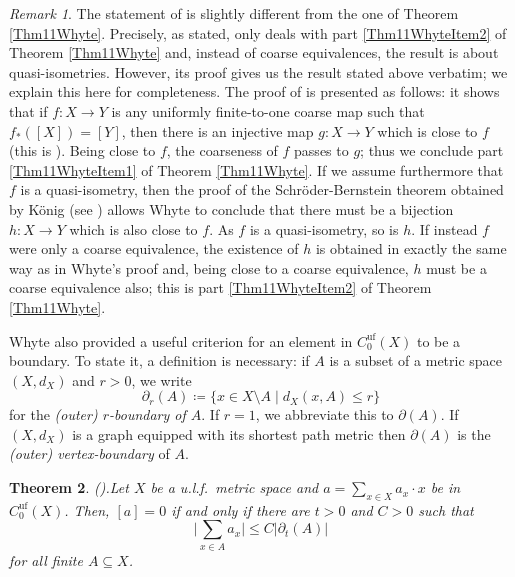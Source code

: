\documentclass[11pt]{amsart}
\numberwithin{equation}{section}
\newtheorem{theorem}{Theorem}[section]
\theoremstyle{definition}
\theoremstyle{remark}
\newtheorem{remark}[theorem]{Remark}
\newcommand{\ri}{\partial}
\numberwithin{equation}{section}
\begin{document}
 

\begin{remark}
The statement of \cite[Theorem 1.1]{Whyte1999Duke} is slightly different from the one of Theorem \ref{Thm11Whyte}. Precisely, as stated, \cite[Theorem 1.1]{Whyte1999Duke} only deals with part \eqref{Thm11WhyteItem2} of Theorem \ref{Thm11Whyte} and, instead of coarse equivalences, the result is about quasi-isometries. However, its proof gives us the result stated above verbatim; we explain this here for completeness. The proof of \cite[Theorem 1.1]{Whyte1999Duke} is presented as follows: it shows that if $f\colon X\to Y$ is any uniformly finite-to-one coarse map such that $f_*([X])=[Y]$, then there is an injective map $g\colon X\to Y$ which is close to $f$ (this is \cite[Lemma 4.2]{Whyte1999Duke}). Being close to $f$, the coarseness of $f$ passes to $g$; thus we conclude part \eqref{Thm11WhyteItem1} of Theorem \ref{Thm11Whyte}. If we assume furthermore that $f$ is a quasi-isometry, then the proof of the Schr\"oder-Bernstein theorem obtained by K\"{o}nig (see \cite[Page 88]{HalmosBook}) allows Whyte to conclude that there must be a bijection $h\colon X\to Y$ which is also close to $f$. As $f$ is a quasi-isometry, so is $h$. If instead $f$ were only a coarse equivalence, the existence of $h$ is obtained in exactly the same way as in Whyte's proof and, being close to a coarse equivalence, $h$ must be a coarse equivalence also; this is part \eqref{Thm11WhyteItem2} of Theorem \ref{Thm11Whyte}.
\end{remark}

Whyte also provided a useful criterion for an element in $C^{\textrm{uf}}_0(X)$ to be a boundary. To state it, a definition is necessary: if $A$ is a subset of a metric space $(X,d_X)$ and $r>0$, we write \[\ri_r(A)\coloneqq \{x\in X\setminus A\mid d_X(x,A)\leq r\}\] for the \emph{(outer) $r$-boundary of $A$}. If $r=1$, we abbreviate this to $\ri(A)$. If $(X,d_X)$ is a graph equipped with its shortest path metric then $\ri(A)$ is the \emph{(outer) vertex-boundary} of $A$.
 
\begin{theorem} \emph{(}\cite[Theorem 7.6]{Whyte1999Duke}\emph{).}\label{T.[a]=0iff...}
 Let $X$ be a u.l.f.\ metric space and $a=\sum_{x\in X}a_x\cdot x$ be in $C_0^{\textrm{uf}}(X)$. Then, $[a]=0$ if and only if there are $t>0$ and $C>0$ such that 
 \[
 \Bigg|\sum_{x\in A}a_x\Bigg|\leq C|\ri_t(A)|
 \]
 for all finite $A\subseteq X$.
\label{Thm76Whyte}
\end{theorem}
\end{document}
